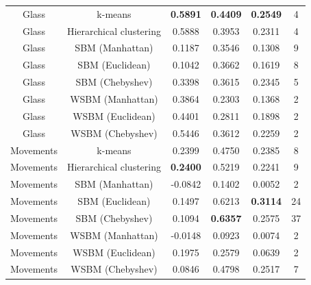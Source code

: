 \documentclass[conference]{IEEEtran}
\begin{document}
\begin{table}[t]
\begin{tabular}{c | c | c c c | c}
    \hline
    Glass & k-means & \textbf{0.5891} & \textbf{0.4409} & \textbf{0.2549} & 4 \\
    Glass & Hierarchical clustering & 0.5888 & 0.3953 & 0.2311 & 4 \\
    Glass & SBM (Manhattan) & 0.1187 & 0.3546 & 0.1308 & 9 \\
    Glass & SBM (Euclidean) & 0.1042 & 0.3662 & 0.1619 & 8 \\
    Glass & SBM (Chebyshev) & 0.3398 & 0.3615 & 0.2345 & 5 \\
    Glass & WSBM (Manhattan) & 0.3864 & 0.2303 & 0.1368 & 2 \\
    Glass & WSBM (Euclidean) & 0.4401 & 0.2811 & 0.1898 & 2 \\
    Glass & WSBM (Chebyshev) & 0.5446 & 0.3612 & 0.2259 & 2 \\

    \hline
    Movements & k-means & 0.2399 & 0.4750 & 0.2385 & 8 \\
    Movements & Hierarchical clustering & \textbf{0.2400} & 0.5219 & 0.2241 & 9 \\
    Movements & SBM (Manhattan) & -0.0842 & 0.1402 & 0.0052 & 2 \\
    Movements & SBM (Euclidean) & 0.1497 & 0.6213 & \textbf{0.3114} & 24 \\
    Movements & SBM (Chebyshev) & 0.1094 & \textbf{0.6357} & 0.2575 & 37 \\
    Movements & WSBM (Manhattan) & -0.0148 & 0.0923 & 0.0074 & 2 \\
    Movements & WSBM (Euclidean) & 0.1975 & 0.2579 & 0.0639 & 2 \\
    Movements & WSBM (Chebyshev) & 0.0846 & 0.4798 & 0.2517 & 7 \\



\end{tabular}
\end{table}
\end{document}
